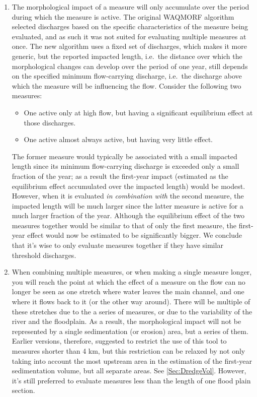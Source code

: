 \begin{enumerate}
\item The morphological impact of a measure will only accumulate over the period during which the measure is active.
The original WAQMORF algorithm selected discharges based on the specific characteristics of the measure being evaluated, and as such it was not suited for evaluating multiple measures at once.
The new algorithm uses a fixed set of discharges, which makes it more generic, but the reported impacted length, i.e.~the distance over which the morphological changes can develop over the period of one year, still depends on the specified minimum flow-carrying discharge, i.e.~the discharge above which the measure will be influencing the flow.
Consider the following two measures:
\begin{itemize}
\item One active only at high flow, but having a significant equilibrium effect at those discharges.
\item One active almost always active, but having very little effect.
\end{itemize}
The former measure would typically be associated with a small impacted length since its minimum flow-carrying discharge is exceeded only a small fraction of the year; as a result the first-year impact (estimated as the equilibrium effect accumulated over the impacted length) would be modest.
However, when it is evaluated \emph{in combination with} the second measure, the impacted length will be much larger since the latter measure is active for a much larger fraction of the year.
Although the equilibrium effect of the two measures together would be similar to that of only the first measure, the first-year effect would now be estimated to be significantly bigger.
We conclude that it's wise to only evaluate measures together if they have similar threshold discharges.

\item When combining multiple measures, or when making a single measure longer, you will reach the point at which the effect of a measure on the flow can no longer be seen as one stretch where water leaves the main channel, and one where it flows back to it (or the other way around).
There will be multiple of these stretches due to the a series of measures, or due to the variability of the river and the floodplain.
As a result, the morphological impact will not be represented by a single sedimentation (or erosion) area, but a series of them.
Earlier versions, therefore, suggested to restrict the use of this tool to measures shorter than 4 km, but this restriction can be relaxed by not only taking into account the most upstream area in the estimation of the first-year sedimentation volume, but all separate areas.
See \autoref{Sec:DredgeVol}.
However, it's still preferred to evaluate measures less than the length of one flood plain section.


\end{enumerate}
